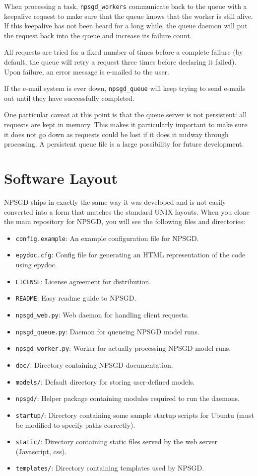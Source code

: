 \documentclass{article}
\newcommand{\mpath}[1]{\texttt{#1}}
\begin{document}
When processing a task, \texttt{npsgd\_workers} communicate back to the queue
with a keepalive request to make sure that the queue knows that the worker is
still alive. If this keepalive has not been heard for a long while, the queue
daemon will put the request back into the queue and increase its failure count.

All requests are tried for a fixed number of times before a complete failure (by
default, the queue will retry a request three times before declaring it failed).
Upon failure, an error message is e-mailed to the user.

If the e-mail system is ever down, \texttt{npsgd\_queue} will keep trying to send e-mails out
until they have successfully completed.

One particular caveat at this point is that the queue server is not
persistent: all requests are kept in memory. This makes it particularly
important to make sure it does not go down as requests could be lost if it does
it midway through processing. A persistent queue file is a large possibility for
future development.

\section{Software Layout}
NPSGD ships in exactly the same way it was developed and is not easily converted
into a form that matches the standard UNIX layouts. When you clone the main
repository for NPSGD, you will see the following files and directories:
\begin{itemize}
    \item \mpath{config.example}: An example configuration file for NPSGD.
    \item \mpath{epydoc.cfg}: Config file for generating an HTML representation
          of the code using epydoc.
    \item \mpath{LICENSE}: License agreement for distribution.
    \item \mpath{README}: Easy readme guide to NPSGD.
    \item \mpath{npsgd\_web.py}: Web daemon for handling client requests.
    \item \mpath{npsgd\_queue.py}: Daemon for queueing NPSGD model runs.
    \item \mpath{npsgd\_worker.py}: Worker for actually processing NPSGD model
          runs.
    \item \mpath{doc/}: Directory containing NPSGD documentation.
    \item \mpath{models/}: Default directory for storing user-defined models.
    \item \mpath{npsgd/}: Helper package containing modules required to run the
          daemons.
    \item \mpath{startup/}: Directory containing some sample startup scripts for
          Ubuntu (must be modified to specify paths correctly).
    \item \mpath{static/}: Directory containing static files served by the web
          server (Javascript, css).
    \item \mpath{templates/}: Directory containing templates used by NPSGD.
\end{itemize}
\end{document}
